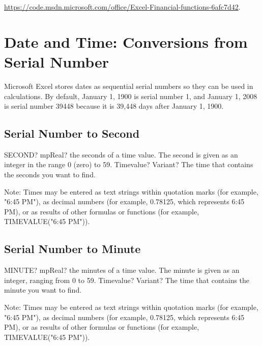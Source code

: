 \vpara
\href{https://code.msdn.microsoft.com/office/Excel-Financial-functions-6afc7d42}{https://code.msdn.microsoft.com/office/Excel-Financial-functions-6afc7d42}.





\section{Date and Time: Conversions from Serial Number}
Microsoft Excel stores dates as sequential serial numbers so they can be used in calculations. By default, January 1, 1900 is serial number 1, and January 1, 2008 is serial number 39448 because it is 39,448 days after January 1, 1900.



\subsection{Serial Number to Second}

\begin{mpFunctionsExtract}
	\mpWorksheetFunctionOneNotImplemented
	{SECOND? mpReal? the seconds of a time value. The second is given as an integer in the range 0 (zero) to 59.}
	{Timevalue? Variant? The time that contains the seconds you want to find.}
\end{mpFunctionsExtract}

\vspace{0.3cm}
Note: Times may be entered as text strings within quotation marks (for example, "6:45 PM"), as decimal numbers (for example, 0.78125, which represents 6:45 PM), or as results of other formulas or functions (for example, TIMEVALUE("6:45 PM")).



\subsection{Serial Number to Minute}

\begin{mpFunctionsExtract}
	\mpWorksheetFunctionOneNotImplemented
	{MINUTE? mpReal? the minutes of a time value. The minute is given as an integer, ranging from 0 to 59.}
	{Timevalue? Variant? The time that contains the minute you want to find.}
\end{mpFunctionsExtract}

\vspace{0.3cm}
Note: Times may be entered as text strings within quotation marks (for example, "6:45 PM"), as decimal numbers (for example, 0.78125, which represents 6:45 PM), or as results of other formulas or functions (for example, TIMEVALUE("6:45 PM")).



